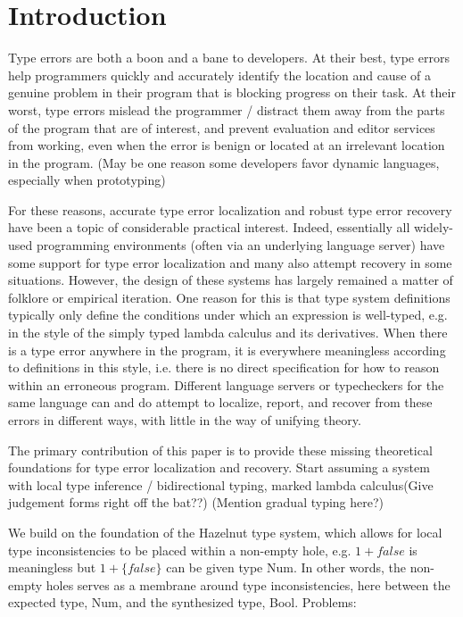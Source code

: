 \section{Introduction}
\label{sec:introduction}

Type errors are both a boon and a bane to developers.
At their best, type errors help programmers quickly and accurately identify the location and cause of a genuine problem in their program that is blocking progress on their task. 
At their worst, type errors mislead the programmer / distract them away from the parts of the program that are of interest, and 
prevent evaluation and editor services from working, even when the error is benign or located at an irrelevant location in the program. 
(May be one reason some developers favor dynamic languages, especially when prototyping)

For these reasons, accurate type error localization and robust type error recovery have been a topic of considerable practical interest. 
Indeed, essentially all widely-used programming environments (often via an underlying language server) have some support for type error 
localization and many also attempt recovery in some situations. However, the design of these systems has largely remained a matter of folklore or empirical iteration. 
One reason for this is 
that type system definitions typically only define the conditions under which an expression is well-typed, e.g. in the style of the simply typed lambda calculus and its derivatives. When there is a type error anywhere in the program, it is everywhere meaningless according to definitions in this style, i.e. there is no direct specification for how to reason within an erroneous program. Different language servers or typecheckers for the same language can and do attempt to localize, report, and recover from these errors in different ways, with little in the way of unifying theory. 

The primary contribution of this paper is to provide these missing theoretical foundations for type error localization and recovery. 
Start assuming a system with local type inference / bidirectional typing, marked lambda calculus(Give judgement forms right off the bat??) 
(Mention gradual typing here?)

We build on the foundation of the Hazelnut type system, which allows for local type inconsistencies to be placed within a non-empty hole, 
e.g. $1 + false$ is meaningless but $1 + \{false\}$ can be given type Num. In other words, the non-empty holes serves as a membrane around type inconsistencies, here between the expected type, Num, and the synthesized type, Bool. Problems:

